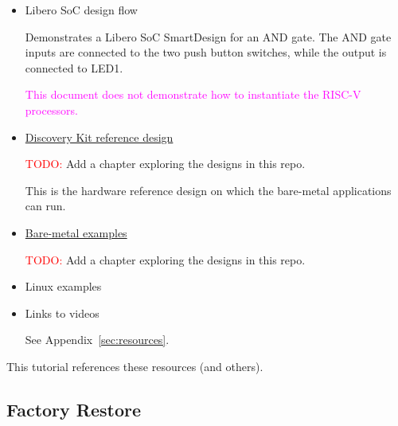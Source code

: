 \begin{itemize}
\item Libero SoC design flow~\cite{Microchip_AN5282_2024}

Demonstrates a Libero SoC SmartDesign for an AND gate. The AND gate inputs are
connected to the two push button switches, while the output is connected to
LED1.

\textcolor{magenta}{This document does not demonstrate how to instantiate the RISC-V processors.}


\item \href{https://github.com/polarfire-soc/polarfire-soc-discovery-kit-reference-design}{Discovery Kit reference design}

\textcolor{red}{TODO:} Add a chapter exploring the designs in this repo.

This is the hardware reference design on which the bare-metal applications can run.

\item \href{https://github.com/polarfire-soc/polarfire-soc-bare-metal-examples}{Bare-metal examples}

\textcolor{red}{TODO:} Add a chapter exploring the designs in this repo.

\item Linux examples
\item Links to videos

See Appendix~\ref{sec:resources}.

\end{itemize}
%
This tutorial references these resources (and others).

\clearpage
\subsection{Factory Restore}
\label{sec:factory_restore}

